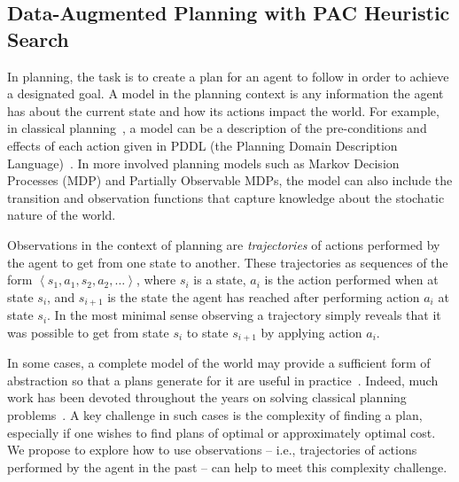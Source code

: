 \documentclass[12pt]{article}
\newcommand{\tuple}[1]{\ensuremath{\left \langle #1 \right \rangle }}
\begin{document}
\subsection{Data-Augmented Planning with PAC Heuristic Search}

In planning, the task is to create a plan for an agent to follow in order to achieve a designated goal. A model in the planning context is any information the agent has about the current state and how its actions impact the world. For example, in classical planning~\cite{fikes1971strips}, a model can be a description of the pre-conditions and effects of each action given in PDDL (the Planning Domain Description Language)~\cite{mcdermott1998pddl}. In more involved planning models such as Markov Decision Processes (MDP) and Partially Observable MDPs, the model can also include the transition and observation functions that capture knowledge about the stochatic nature of the world. 


Observations in the context of planning are {\em trajectories} of actions performed by the agent to get from one state to another. These trajectories as sequences of the form $\tuple{ s_1, a_1, s_2, a_2, \ldots}$, where $s_i$ is a state, $a_i$ is the action performed when at state $s_i$, and $s_{i+1}$ is the state the agent has reached after performing action $a_i$ at state $s_i$. In the most minimal sense observing a trajectory simply reveals that it was possible to get from state $s_i$ to state $s_{i+1}$ by applying action $a_i$. %


In some cases, a complete model of the world may provide a sufficient form of abstraction so that a plans generate for it are useful in practice~\cite{ruml2011line,robinson2014cost,hoffmann2015simulated,hoffmann2007web}. Indeed, much work has been devoted throughout the years on solving classical planning problems~\cite{ghallab2004automated}. A key challenge in such cases is the complexity of finding a plan, especially if one wishes to find plans of optimal or approximately optimal cost. 
We propose to explore how to use observations -- i.e., trajectories of actions performed by the agent in the past -- can help to meet this complexity challenge. %
\end{document}
